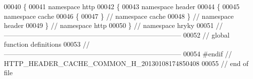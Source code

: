 \begin{DoxyCode}
00040 \{
00041 \textcolor{keyword}{namespace }http
00042 \{
00043 \textcolor{keyword}{namespace }header
00044 \{
00045 \textcolor{keyword}{namespace }cache
00046 \{
00047 \} \textcolor{comment}{// namespace cache}
00048 \} \textcolor{comment}{// namespace header}
00049 \} \textcolor{comment}{// namespace http}
00050 \} \textcolor{comment}{// namespace hryky}
00051 \textcolor{comment}{//
      ------------------------------------------------------------------------------}
00052 \textcolor{comment}{// global function definitions}
00053 \textcolor{comment}{//
      ------------------------------------------------------------------------------}
00054 \textcolor{preprocessor}{#endif // HTTP\_HEADER\_CACHE\_COMMON\_H\_20130108174850408}
00055 \textcolor{preprocessor}{}\textcolor{comment}{// end of file}
\end{DoxyCode}
